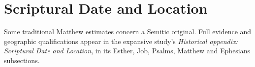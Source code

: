 \section{Scriptural Date and Location}



{\small Some traditional Matthew estimates concern a Semitic original. Full evidence and geographic qualifications appear in the expansive study's \textit{Historical appendix: Scriptural Date and Location}, in its Esther, Job, Psalms, Matthew and Ephesians subsections.\par}
\clearpage
